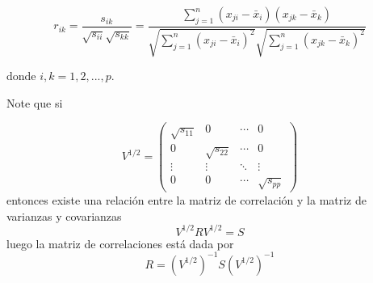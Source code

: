 $$
r_{ik}=\frac{s_{ik}}{\sqrt{s_{ii}}\sqrt{s_{kk}}}=\frac{\sum_{j=1}^n(x_{ji}-\bar{x}_{i})(x_{jk}-\bar{x}_{k})}{\sqrt{\sum_{j=1}^n(x_{ji}-\bar{x}_{i})^2}\sqrt{\sum_{j=1}^n(x_{jk}-\bar{x}_{k})^2}}
$$


donde $i,k=1,2,...,p$.




Note que si

$$
V^{1/2}=\left( 
\begin{array}{cccc}
\sqrt{s_{11}} & 0             & \cdots  & 0 \\ 
0             & \sqrt{s_{22}} & \cdots  & 0 \\ 
\vdots        & \vdots        & \ddots  & \vdots  \\ 
0             & 0             & \cdots  & \sqrt{s_{pp}}
\end{array}
\right)
$$ entonces existe una relación entre la matriz de correlación y la
matriz de varianzas y covarianzas $$
V^{1/2}RV^{1/2}=S
$$ luego la matriz de correlaciones está dada por $$
R=(V^{1/2})^{-1}S(V^{1/2})^{-1}
$$